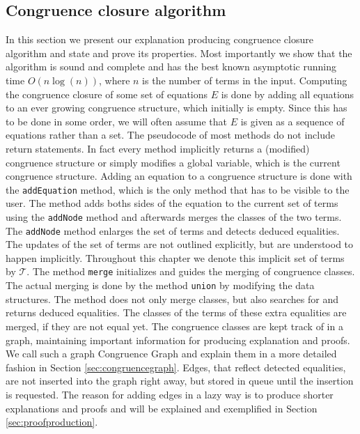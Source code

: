 \subsection*{Congruence closure algorithm}
\label{sec:congruenceclosurealgorithm}
In this section we present our explanation producing congruence closure algorithm and state and prove its properties.
Most importantly we show that the algorithm is sound and complete and has the best known asymptotic running time $O(n \log(n))$, where $n$ is the number of terms in the input.
Computing the congruence closure of some set of equations $E$ is done by adding all equations to an ever growing congruence structure, which initially is empty.
Since this has to be done in some order, we will often assume that $E$ is given as a sequence of equations rather than a set.
The pseudocode of most methods do not include return statements.
In fact every method implicitly returns a (modified) congruence structure or simply modifies a global variable, which is the current congruence structure.
Adding an equation to a congruence structure is done with the \texttt{addEquation} method, which is the only method that has to be visible to the user.
The method adds boths sides of the equation to the current set of terms using the \texttt{addNode} method and afterwards merges the classes of the two terms.
The \texttt{addNode} method enlarges the set of terms and detects deduced equalities.
The updates of the set of terms are not outlined explicitly, but are understood to happen implicitly.
Throughout this chapter we denote this implicit set of terms by $\mathcal{T}$.
The method \texttt{merge} initializes and guides the merging of congruence classes.
The actual merging is done by the method \texttt{union} by modifying the data structures.
The method does not only merge classes, but also searches for and returns deduced equalities.
The classes of the terms of these extra equalities are merged, if they are not equal yet.
The congruence classes are kept track of in a graph, maintaining important information for producing explanation and proofs.
We call such a graph Congruence Graph and explain them in a more detailed fashion in Section \ref{sec:congruencegraph}.
Edges, that reflect detected equalities, are not inserted into the graph right away, but stored in queue until the insertion is requested.
The reason for adding edges in a lazy way is to produce shorter explanations and proofs and will be explained and exemplified in Section \ref{sec:proofproduction}.



